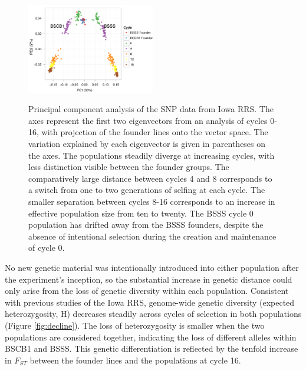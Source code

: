 \begin{figure}[tb]   
  \begin{center}
   \vspace{-0mm}
   \includegraphics[width=0.5\textwidth]{fig1}
   \renewcommand{\baselinestretch}{0.9}
   \vspace{-3mm}
   \caption{Principal component analysis of the SNP data from Iowa RRS. The axes represent the first two eigenvectors from an analysis of cycles 0-16, with projection of the founder lines onto the vector space. The variation explained by each eigenvector is given in parentheses on the axes. The populations steadily diverge at increasing cycles, with less distinction visible between the founder groups. The comparatively large distance between cycles 4 and 8 corresponds to a switch from one to two generations of selfing at each cycle. The smaller separation between cycles 8-16 corresponds to an increase in effective population size from ten to twenty. The BSSS cycle 0 population has drifted away from the BSSS founders, despite the absence of intentional selection during the creation and maintenance of cycle 0.
} 
\vspace{-6mm}
    \label{fig:pca}
  \end{center}
\end{figure}

No new genetic material was intentionally introduced into either population after the experiment's inception, so the substantial increase in genetic distance could only arise from the loss of genetic diversity within each population. 
Consistent with previous studies of the Iowa RRS, genome-wide genetic diversity (expected heterozygosity, H) decreases steadily across cycles of selection in both populations (Figure \ref{fig:decline}). 
The loss of heterozygosity is smaller when the two populations are considered together, indicating the loss of different alleles within BSCB1 and BSSS. 
This genetic differentiation is reflected by the tenfold increase in $F_{ST}$ between the founder lines and the populations at cycle 16. 

